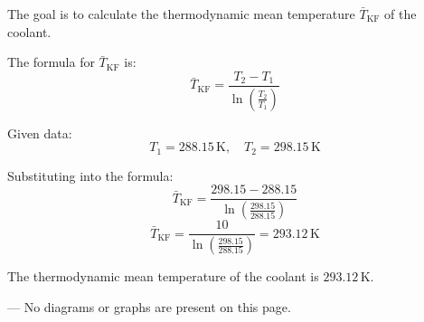 The goal is to calculate the thermodynamic mean temperature \( \bar{T}_{\text{KF}} \) of the coolant.  

The formula for \( \bar{T}_{\text{KF}} \) is:  
\[
\bar{T}_{\text{KF}} = \frac{T_2 - T_1}{\ln \left( \frac{T_2}{T_1} \right)}
\]  

Given data:  
\[
T_1 = 288.15 \, \text{K}, \quad T_2 = 298.15 \, \text{K}
\]  

Substituting into the formula:  
\[
\bar{T}_{\text{KF}} = \frac{298.15 - 288.15}{\ln \left( \frac{298.15}{288.15} \right)}
\]  
\[
\bar{T}_{\text{KF}} = \frac{10}{\ln \left( \frac{298.15}{288.15} \right)} = 293.12 \, \text{K}
\]  

The thermodynamic mean temperature of the coolant is \( 293.12 \, \text{K} \).  

---  
No diagrams or graphs are present on this page.
